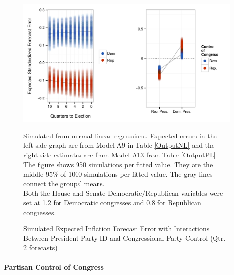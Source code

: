 \documentclass[a4paper]{article}
\newenvironment{knitrout}{}{} %
\begin{document}
\begin{figure}[t]
    \caption{Simulated Expected Inflation Forecast Error with Interactions Between President Party ID and Congressional Party Control (Qtr. 2 forecasts)}
    \label{InterPlot}
    \begin{center}

\begin{knitrout}
\color{fgcolor}

{\centering \includegraphics[width=0.7\linewidth]{figure/InterPlot} 

}



\end{knitrout}


    \end{center}
    \begin{singlespace}
        {\scriptsize{Simulated from normal linear regressions. Expected errors in the left-side graph are from Model A9 in Table \ref{OutputNL} and the right-side estimates are from Model A13 from Table \ref{OutputPL}. The figure shows 950 simulations per fitted value. They are the middle 95\% of 1000 simulations per fitted value. The gray lines connect the groups' means.  \\ Both the House and Senate Democratic/Republican variables were set at 1.2 for Democratic congresses and 0.8 for Republican congresses.}}
    \end{singlespace}
\end{figure}

\paragraph{Partisan Control of Congress}
\end{document}
